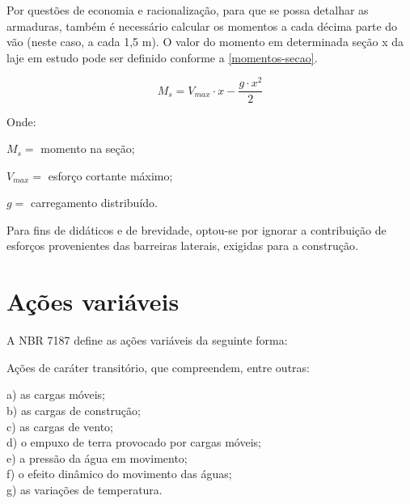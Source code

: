 
Por questões de economia e racionalização, para que se possa detalhar as armaduras, também é necessário calcular os momentos a cada décima parte do vão (neste caso, a cada 1,5 m). O valor do momento em determinada seção x da laje em estudo pode ser definido conforme a \autoref{momentos-secao}.

\begin{equation} \label{momentos-secao}
M_s = V_{max} \cdot x -\frac{g \cdot x^2}{2}
\end{equation}

Onde:

$ M_s = $ momento na seção;

$ V_{max} =  $ esforço cortante máximo;

$ g = $ carregamento distribuído.

Para fins de didáticos e de brevidade, optou-se por ignorar a contribuição de esforços provenientes das barreiras laterais, exigidas para a construção.

\section{Ações variáveis}

A NBR 7187 \cite[p.~5]{NBR7187:2013} define as ações variáveis da seguinte forma:

\begin{citacao}
Ações de caráter transitório, que compreendem, entre outras:

a) as cargas móveis;\\
b) as cargas de construção;\\
c) as cargas de vento;\\
d) o empuxo de terra provocado por cargas móveis;\\
e) a pressão da água em movimento;\\
f) o efeito dinâmico do movimento das águas;\\
g) as variações de temperatura.\\
\end{citacao}

